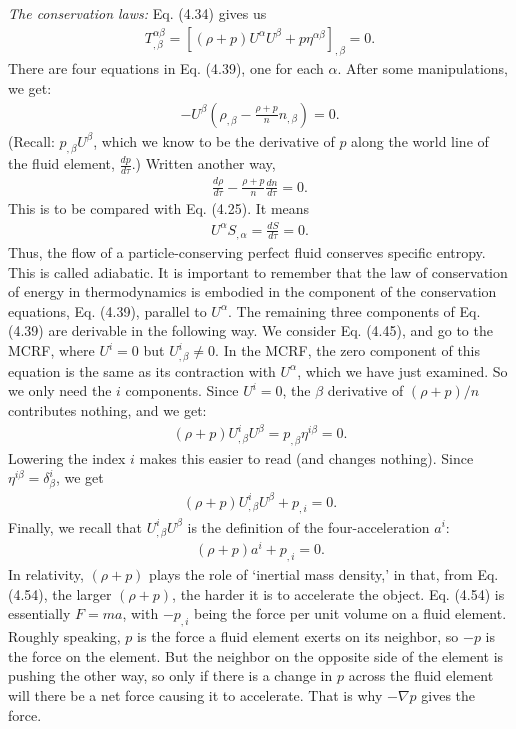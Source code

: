 \documentclass[11pt,letterpaper]{book}
\begin{document}
    \textit{The conservation laws:} 
    Eq. (4.34) gives us
    \begin{align}
    T^{\alpha\beta}_{,\beta} = \left[ (\rho + p) U^\alpha U^\beta + p \eta^{\alpha\beta} \right]_{,\beta} = 0. \tag{4.39}
    \end{align}
    There are four equations in Eq. (4.39), one for each \(\alpha\). After some manipulations, we get:
    \begin{align}
    - U^\beta \left( \rho_{,\beta} - \frac{\rho + p}{n} n_{,\beta} \right) = 0. \tag{4.48}
    \end{align}
    (Recall: \(p_{,\beta} U^\beta\), which we know to be the derivative of \(p\) along the world line of the fluid element, \(\frac{dp}{d\tau}\).) Written another way, 
    \begin{align}
    \frac{d \rho}{d \tau} - \frac{\rho + p}{n} \frac{d n}{d \tau} = 0. \tag{4.49}
    \end{align}
    This is to be compared with Eq. (4.25). It means
    \begin{align}
    U^\alpha S_{,\alpha} = \frac{dS}{d \tau} = 0. \tag{4.50}
    \end{align}
    Thus, the flow of a particle-conserving perfect fluid conserves specific entropy. This is called adiabatic. It is important to remember that the law of conservation of energy in thermodynamics is embodied in the component of the conservation equations, Eq. (4.39), parallel to \(U^\alpha\). The remaining three components of Eq. (4.39) are derivable in the following way. We consider Eq. (4.45), and go to the MCRF, where \(U^i = 0\) but \(U^i_{,\beta} \neq 0\). In the MCRF, the zero component of this equation is the same as its contraction with \(U^\alpha\), which we have just examined. So we only need the \(i\) components. Since \(U^i = 0\), the \(\beta\) derivative of \((\rho + p)/n\) contributes nothing, and we get:
    \begin{align}
    (\rho + p) U^i_{,\beta} U^\beta = p_{,\beta} \eta^{i\beta} = 0. \tag{4.52}
    \end{align}
    Lowering the index \(i\) makes this easier to read (and changes nothing). Since \(\eta^{i\beta} = \delta^i_\beta\), we get
    \begin{align}
    (\rho + p) U^i_{,\beta} U^\beta + p_{,i} = 0. \tag{4.53}
    \end{align}
    Finally, we recall that \(U^i_{,\beta} U^\beta\) is the definition of the four-acceleration \(a^i\):
    \begin{align}
    (\rho + p) a^i + p_{,i} = 0. \tag{4.54}
    \end{align}
    In relativity, \((\rho + p)\) plays the role of ‘inertial mass density,’ in that, from Eq. (4.54), the larger \((\rho + p)\), the harder it is to accelerate the object. Eq. (4.54) is essentially \(F = ma\), with \(-p_{,i}\) being the force per unit volume on a fluid element. Roughly speaking, \(p\) is the force a fluid element exerts on its neighbor, so \(-p\) is the force on the element. But the neighbor on the opposite side of the element is pushing the other way, so only if there is a change in \(p\) across the fluid element will there be a net force causing it to accelerate. That is why \(-\nabla p\) gives the force.
    
\end{document}
